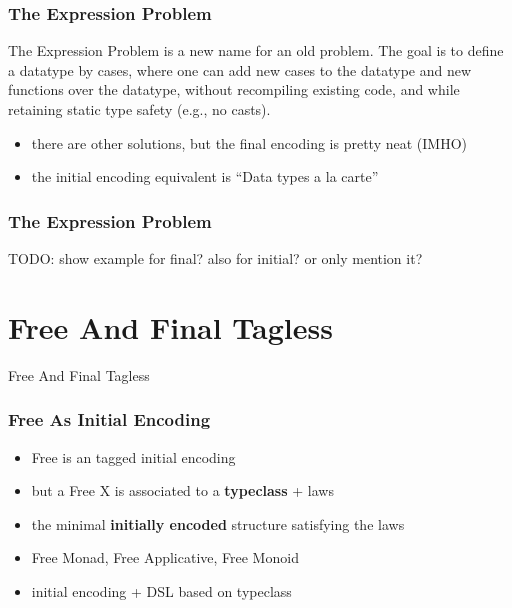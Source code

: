 \documentclass[aspectratio=169, hyperref={colorlinks, linkcolor=beamer@centricgreen}, urlcolor=links]{beamer}
\begin{document}
\begin{frame}
  \frametitle{The Expression Problem}
  \begin{tcolorbox}[
    fonttitle=\sffamily\bfseries,
    colbacktitle=black,
    colframe=black,
    coltitle=beamer@centricgreen,
    title=Philip Wadler on 12. November 1998
    ]
    The Expression Problem is a new name for an old problem.  The goal
    is to define a datatype by cases, where one can add new cases to
    the datatype and new functions over the datatype, without
    recompiling existing code, and while retaining static type safety
    (e.g., no casts).
  \end{tcolorbox}
  \begin{itemize}
  \item there are other solutions, but the final encoding is
    pretty neat (IMHO)
  \item the initial encoding equivalent is ``Data types a la carte''
  \end{itemize}
\end{frame}

\begin{frame}
  \frametitle{The Expression Problem}
  TODO: show example for final? also for initial? or only mention it?
\end{frame}

\section{Free And Final Tagless}\label{sec:free-and-final-tagless}

\begin{frame}
  \begin{center}
    \Huge
    Free And Final Tagless
  \end{center}
\end{frame}

\begin{frame}
  \frametitle{Free As Initial Encoding}
  \begin{itemize}
  \item Free is an tagged initial encoding
  \item but a Free X is associated to a \textbf{typeclass} + laws
  \item the minimal \textbf{initially encoded} structure satisfying
    the laws
  \item Free Monad, Free Applicative, Free Monoid
  \item initial encoding + DSL based on typeclass
  \end{itemize}
\end{frame}
\end{document}
